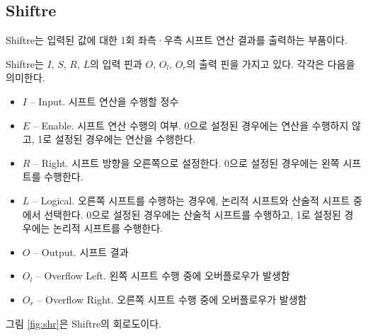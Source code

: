 \documentclass{article}
\renewcommand{\figurename}{그림}
\begin{document}
\pagebreak %

\subsection{Shiftre}

Shiftre는 입력된 값에 대한 1회 좌측·우측 시프트 연산 결과를 출력하는
부품이다.

Shiftre는 $I$, $S$, $R$, $L$의 입력 핀과
$O$, $O_l$, $O_r$의 출력 핀을 가지고 있다. 각각은 다음을 의미한다.

\begin{itemize}
    \item $I$ -- Input. 시프트 연산을 수행할 정수
    \item $E$ -- Enable. 시프트 연산 수행의 여부.
        0으로 설정된 경우에는 연산을 수행하지 않고,
        1로 설정된 경우에는 연산을 수행한다.
    \item $R$ -- Right. 시프트 방향을 오른쪽으로 설정한다.
        0으로 설정된 경우에는 왼쪽 시프트를 수행한다.
    \item $L$ -- Logical. 오른쪽 시프트를 수행하는 경우에,
        논리적 시프트와 산술적 시프트 중에서 선택한다.
        0으로 설정된 경우에는 산술적 시프트를 수행하고,
        1로 설정된 경우에는 논리적 시프트를 수행한다.
    \item $O$ -- Output. 시프트 결과
    \item $O_l$ -- Overflow Left. 왼쪽 시프트 수행 중에 오버플로우가 발생함
    \item $O_r$ -- Overflow Right. 오른쪽 시프트 수행 중에 오버플로우가 발생함
\end{itemize}

\figurename{} \ref{fig:shr}은 Shiftre의 회로도이다.
\end{document}
